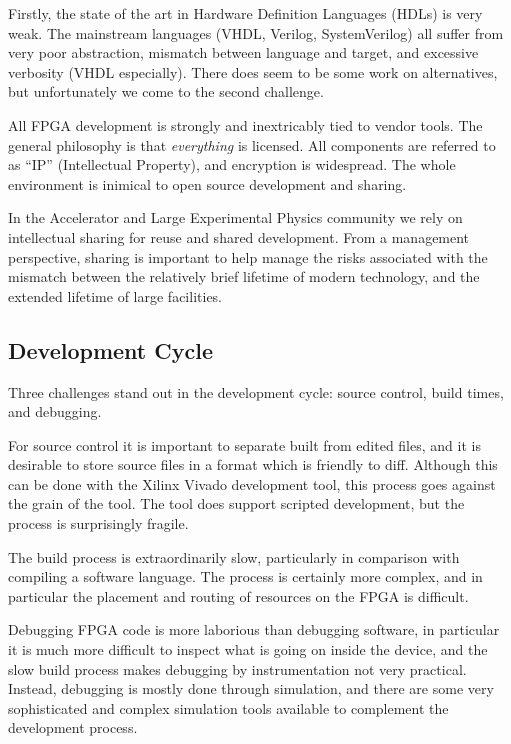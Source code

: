 \documentclass[
    a4paper,
    keeplastbox,            %
    hyphens,                %
    nospread,               %
]{jacow-2_1}
\begin{document}
Firstly, the state of the art in Hardware Definition Languages (HDLs) is very
weak.  The mainstream languages (VHDL, Verilog, SystemVerilog) all suffer from
very poor abstraction, mismatch between language and target, and excessive
verbosity (VHDL especially).  There does seem to be some work on alternatives,
but unfortunately we come to the second challenge.

All FPGA development is strongly and inextricably tied to vendor tools.  The
general philosophy is that \emph{everything} is licensed.  All components
are referred to as ``IP'' (Intellectual Property), and encryption is widespread.
The whole environment is inimical to open source development and sharing.

In the Accelerator and Large Experimental Physics community we rely on
intellectual sharing for reuse and shared development.  From a management
perspective, sharing is important to help manage the risks associated with the
mismatch between the relatively brief lifetime of modern technology, and the
extended lifetime of large facilities.


\subsection{Development Cycle}

Three challenges stand out in the development cycle: source control, build
times, and debugging.

For source control it is important to separate built from edited files, and it
is desirable to store source files in a format which is friendly to diff.
Although this can be done with the Xilinx Vivado development tool, this process
goes against the grain of the tool.  The tool does support scripted development,
but the process is surprisingly fragile.

The build process is extraordinarily slow, particularly in comparison with
compiling a software language.  The process is certainly more complex, and in
particular the placement and routing of resources on the FPGA is difficult.

Debugging FPGA code is more laborious than debugging software, in particular it
is much more difficult to inspect what is going on inside the device, and the
slow build process makes debugging by instrumentation not very practical.
Instead, debugging is mostly done through simulation, and there are some very
sophisticated and complex simulation tools available to complement the
development process.
\end{document}
